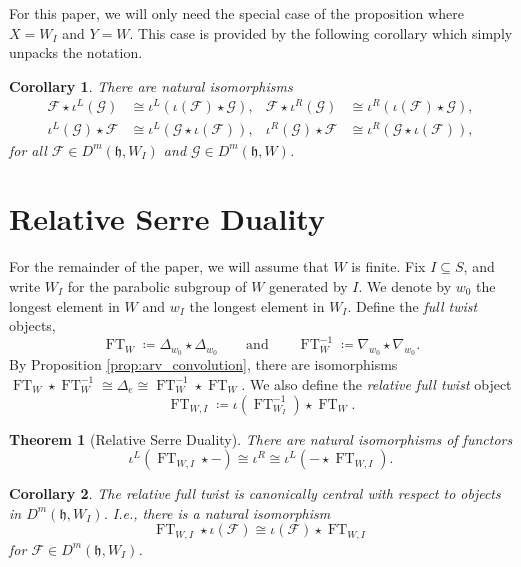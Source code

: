 \documentclass{amsart}
\newcommand{\scrF}{\mathcal{F}}
\newcommand{\scrG}{\mathcal{G}}
\newcommand{\BE}{D^m}
\newcommand{\fr}[1]{\mathfrak{#1}}
\newtheorem{corollary}{Corollary}[section]
\newtheorem{theorem}{Theorem}[section]
\theoremstyle{definition}
\DeclareMathOperator{\FT}{FT}
\begin{document}
        For this paper, we will only need the special case of the proposition where $X = W_I$ and $Y = W$. This case is provided by the following corollary which simply unpacks the notation.

        \begin{corollary}\label{cor:par_linearity}
               There are natural isomorphisms
                   \begin{align*}
                \scrF \star \iota^L (\scrG) &\cong \iota^L (\iota (\scrF) \star \scrG), & \scrF \star \iota^R (\scrG) &\cong \iota^R (\iota (\scrF) \star \scrG), \\
                \iota^L (\scrG) \star \scrF &\cong \iota^L (\scrG \star \iota (\scrF)), & \iota^R (\scrG) \star \scrF &\cong \iota^R (\scrG \star \iota (\scrF)),
        \end{align*}
        for all $\scrF \in \BE (\fr{h}, W_I)$ and $\scrG \in \BE (\fr{h}, W)$.
        \end{corollary}

        \section{Relative Serre Duality}

        For the remainder of the paper, we will assume that $W$ is finite.
        Fix $I \subseteq S$, and write $W_I$ for the parabolic subgroup of $W$ generated by $I$. 
        We denote by $w_0$ the longest element in $W$ and $w_I$ the longest element in $W_I$.
        Define the \emph{full twist} objects,
        \[ \FT_W \coloneq \Delta_{w_0} \star \Delta_{w_0} \qquad\text{and}\qquad \FT_W^{-1} \coloneq \nabla_{w_0} \star \nabla_{w_0}.\]
        By Proposition \ref{prop:arv_convolution}, there are isomorphisms $\FT_W \star \FT_W^{-1} \cong \Delta_e \cong \FT_W^{-1} \star \FT_W$.
        We also define the \emph{relative full twist} object 
        \[ \FT_{W, I} \coloneq \iota (\FT_{W_I}^{-1}) \star \FT_W. \]


        \begin{theorem}[Relative Serre Duality]\label{thm:rel_serre_duality}
                There are natural isomorphisms of functors 
                \[\iota^L (\FT_{W, I} \star -) \cong  \iota^R \cong \iota^L (- \star \FT_{W, I}).\]
        \end{theorem}

        \begin{corollary}\label{cor:rel_full_twist_centrality}
                The relative full twist is canonically central with respect to objects in $\BE (\fr{h}, W_I)$. 
                I.e., there is a natural isomorphism
                \[\FT_{W, I} \star \iota (\scrF) \cong \iota (\scrF) \star \FT_{W, I}\]
                for $\scrF \in \BE (\fr{h}, W_I)$.
        \end{corollary}
\end{document}
